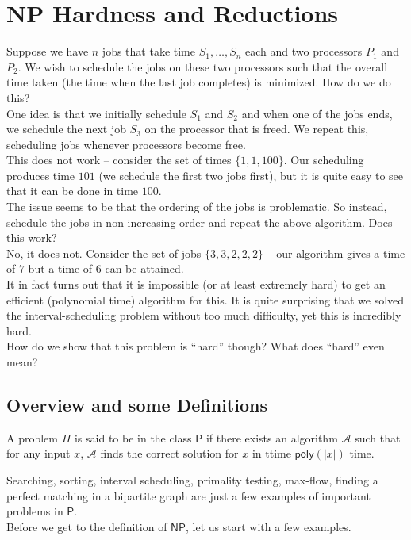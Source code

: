 \section{NP Hardness and Reductions}

Suppose we have $n$ jobs that take time $S_1,\ldots,S_n$ each and two processors $P_1$ and $P_2$. We wish to schedule the jobs on these two processors such that the overall time taken (the time when the last job completes) is minimized. How do we do this?\\

One idea is that we initially schedule $S_1$ and $S_2$ and when one of the jobs ends, we schedule the next job $S_3$ on the processor that is freed. We repeat this, scheduling jobs whenever processors become free.\\
This does not work -- consider the set of times $\{1,1,100\}$. Our scheduling produces time $101$ (we schedule the first two jobs first), but it is quite easy to see that it can be done in time $100$.\\

The issue seems to be that the ordering of the jobs is problematic. So instead, schedule the jobs in non-increasing order and repeat the above algorithm. Does this work?\\
No, it does not. Consider the set of jobs $\{3,3,2,2,2\}$ -- our algorithm gives a time of $7$ but a time of $6$ can be attained.\\

It in fact turns out that it is impossible (or at least extremely hard) to get an efficient (polynomial time) algorithm for this. It is quite surprising that we solved the interval-scheduling problem without too much difficulty, yet this is incredibly hard.\\
How do we show that this problem is ``hard'' though? What does ``hard'' even mean?

\subsection{Overview and some Definitions}

	\begin{fdef}
		A problem $\mathsf{\Pi}$ is said to be in the class $\mathsf{P}$ if there exists an algorithm $\mathcal{A}$ such that for any input $x$, $\mathcal{A}$ finds the correct solution for $x$ in ttime $\textsf{poly}(|x|)$ time.
	\end{fdef}

	Searching, sorting, interval scheduling, primality testing, max-flow, finding a perfect matching in a bipartite graph are just a few examples of important problems in $\mathsf{P}$.\\
	Before we get to the definition of $\mathsf{NP}$, let us start with a few examples.

